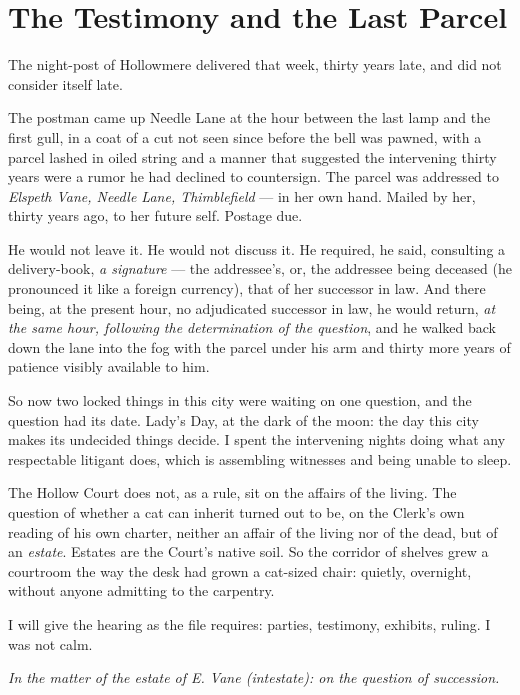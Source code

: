 \chapter{The Testimony and the Last Parcel}

The night-post of Hollowmere delivered that week, thirty years late, and did not consider itself late.

The postman came up Needle Lane at the hour between the last lamp and the first gull, in a coat of a cut not seen since before the bell was pawned, with a parcel lashed in oiled string and a manner that suggested the intervening thirty years were a rumor he had declined to countersign. The parcel was addressed to \emph{Elspeth Vane, Needle Lane, Thimblefield} --- in her own hand. Mailed by her, thirty years ago, to her future self. Postage due.

He would not leave it. He would not discuss it. He required, he said, consulting a delivery-book, \emph{a signature} --- the addressee's, or, the addressee being deceased (he pronounced it like a foreign currency), that of her successor in law. And there being, at the present hour, no adjudicated successor in law, he would return, \emph{at the same hour, following the determination of the question}, and he walked back down the lane into the fog with the parcel under his arm and thirty more years of patience visibly available to him.

So now two locked things in this city were waiting on one question, and the question had its date. Lady's Day, at the dark of the moon: the day this city makes its undecided things decide. I spent the intervening nights doing what any respectable litigant does, which is assembling witnesses and being unable to sleep.

\scenebreak

The Hollow Court does not, as a rule, sit on the affairs of the living. The question of whether a cat can inherit turned out to be, on the Clerk's own reading of his own charter, neither an affair of the living nor of the dead, but of an \emph{estate}. Estates are the Court's native soil. So the corridor of shelves grew a courtroom the way the desk had grown a cat-sized chair: quietly, overnight, without anyone admitting to the carpentry.

I will give the hearing as the file requires: parties, testimony, exhibits, ruling. I was not calm.

\emph{In the matter of the estate of E. Vane (intestate): on the question of succession.}

